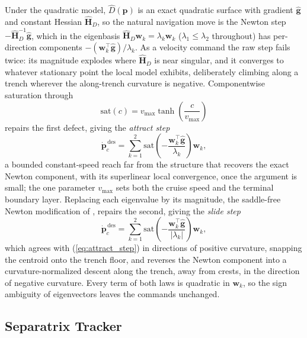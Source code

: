 \documentclass[lettersize,journal]{IEEEtran}
\begin{document}
Under the quadratic model, $\hat{D}(\mathbf{p})$ is an exact quadratic
surface with gradient $\hat{\mathbf{g}}$ and constant Hessian
$\hat{\mathbf{H}}_D$, so the natural navigation move is the Newton step
$-\hat{\mathbf{H}}_D^{-1}\hat{\mathbf{g}}$, which in the eigenbasis
$\hat{\mathbf{H}}_D \mathbf{w}_k = \lambda_k \mathbf{w}_k$ ($\lambda_1
\leq \lambda_2$ throughout) has per-direction components
$-(\mathbf{w}_k^\top \hat{\mathbf{g}})/\lambda_k$. As a velocity
command the raw step fails twice: its magnitude explodes where
$\hat{\mathbf{H}}_D$ is near singular, and it converges to whatever
stationary point the local model exhibits, deliberately climbing along
a trench wherever the along-trench curvature is negative. Componentwise
saturation through
\begin{equation}
    \mathrm{sat}(c) = v_{\max} \tanh\!\left(\frac{c}{v_{\max}}\right)
    \label{eq:sat}
\end{equation}
repairs the first defect, giving the \emph{attract step}
\begin{equation}
    \dot{\mathbf{p}}_c^{\,\text{des}} = \sum_{k=1}^{2}
    \mathrm{sat}\!\left(-\frac{\mathbf{w}_k^\top
    \hat{\mathbf{g}}}{\lambda_k}\right)\mathbf{w}_k,
    \label{eq:attract_step}
\end{equation}
a bounded constant-speed reach far from the structure that recovers the
exact Newton component, with its superlinear local convergence, once
the argument is small; the one parameter $v_{\max}$ sets both the
cruise speed and the terminal boundary layer. Replacing each eigenvalue
by its magnitude, the saddle-free Newton modification of \cite{35},
repairs the second, giving the \emph{slide step}
\begin{equation}
    \dot{\mathbf{p}}_c^{\,\text{des}} = \sum_{k=1}^{2}
    \mathrm{sat}\!\left(-\frac{\mathbf{w}_k^\top
    \hat{\mathbf{g}}}{|\lambda_k|}\right)\mathbf{w}_k,
    \label{eq:slide_step}
\end{equation}
which agrees with (\ref{eq:attract_step}) in directions of positive
curvature, snapping the centroid onto the trench floor, and reverses
the Newton component into a curvature-normalized descent along the
trench, away from crests, in the direction of negative curvature. Every
term of both laws is quadratic in $\mathbf{w}_k$, so the sign ambiguity
of eigenvectors leaves the commands unchanged.

\subsection{Separatrix Tracker}
\label{sec:sep_controller}
\end{document}
